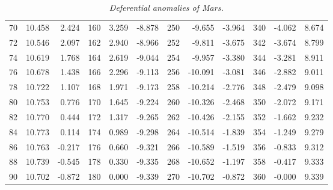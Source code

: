 \begin{table}
{\begin{tabular}{rrr|rrr|rrr|rrr}
 70 &  10.458 &  2.424 & 160 &   3.259 & -8.878 & 250 &  -9.655 & -3.964 & 340 &  -4.062 &  8.674\\
 72 &  10.546 &  2.097 & 162 &   2.940 & -8.966 & 252 &  -9.811 & -3.675 & 342 &  -3.674 &  8.799\\
 74 &  10.619 &  1.768 & 164 &   2.619 & -9.044 & 254 &  -9.957 & -3.380 & 344 &  -3.281 &  8.911\\
 76 &  10.678 &  1.438 & 166 &   2.296 & -9.113 & 256 & -10.091 & -3.081 & 346 &  -2.882 &  9.011\\
 78 &  10.722 &  1.107 & 168 &   1.971 & -9.173 & 258 & -10.214 & -2.776 & 348 &  -2.479 &  9.098\\
 80 &  10.753 &  0.776 & 170 &   1.645 & -9.224 & 260 & -10.326 & -2.468 & 350 &  -2.072 &  9.171\\
 82 &  10.770 &  0.444 & 172 &   1.317 & -9.265 & 262 & -10.426 & -2.155 & 352 &  -1.662 &  9.232\\
 84 &  10.773 &  0.114 & 174 &   0.989 & -9.298 & 264 & -10.514 & -1.839 & 354 &  -1.249 &  9.279\\
 86 &  10.763 & -0.217 & 176 &   0.660 & -9.321 & 266 & -10.589 & -1.519 & 356 &  -0.833 &  9.312\\
 88 &  10.739 & -0.545 & 178 &   0.330 & -9.335 & 268 & -10.652 & -1.197 & 358 &  -0.417 &  9.333\\
 90 &  10.702 & -0.872 & 180 &   0.000 & -9.339 & 270 & -10.702 & -0.872 & 360 &  -0.000 &  9.339\\ 
\end{tabular}}
\caption{\em Deferential anomalies of Mars.}\label{vt9}
\end{table}

